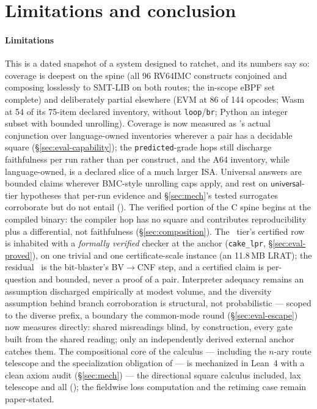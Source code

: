 \section{Limitations and conclusion}
\label{sec:conclusion}

\paragraph{Limitations}
This is a dated snapshot of a system designed to ratchet, and its
numbers say so: coverage is deepest on the spine (all 96 RV64IMC
constructs conjoined and composing losslessly to SMT-LIB on both
routes; the in-scope eBPF set complete) and
deliberately partial elsewhere (EVM at 86 of 144 opcodes; Wasm at 54 of
its 75-item declared inventory, without \texttt{loop}/\texttt{br};
Python an integer subset with bounded
unrolling). Coverage is now measured as 's actual
conjunction over language-owned inventories wherever a pair has a
decidable square (\S\ref{sec:eval-capability}); the
\texttt{predicted}-grade hops still discharge faithfulness per run
rather than per construct, and the A64 inventory, while language-owned,
is a declared slice of a much larger ISA. Universal answers are bounded claims
wherever BMC-style unrolling caps apply, and rest on
$\mathsf{universal}$-tier hypotheses that per-run evidence and
\S\ref{sec:mech}'s tested surrogates corroborate
but do not entail (). The verified portion of the
C spine begins at the compiled binary: the compiler hop has no square
and contributes reproducibility plus a differential, not faithfulness
(\S\ref{sec:composition}). The \tprov\ tier's certified row is inhabited
with a \emph{formally verified} checker at the anchor
(\texttt{cake\_lpr}, \S\ref{sec:eval-proved}), on one trivial and one
certificate-scale instance (an 11.8\,MB LRAT); the residual \tcb\ is
the bit-blaster's BV$\to$CNF step, and a
certified claim is per-question and bounded, never a proof of a pair.
Interpreter adequacy remains an assumption discharged empirically at
modest volume, and the diversity assumption behind branch corroboration
is structural, not probabilistic --- scoped to the diverse prefix, a
boundary the common-mode round (\S\ref{sec:eval-escape}) now measures
directly: shared misreadings blind, by construction, every gate built
from the shared reading; only an independently derived external anchor
catches them.
The compositional core of the calculus --- including the $n$-ary route
telescope and the specialization obligation of  ---
is mechanized in Lean~4 with a clean axiom audit
(\S\ref{sec:mech})\ifarxiv{} --- the directional square calculus
included, lax telescope and all
()\fi{}; the fieldwise loss computation and the retiming
case remain paper-stated.

